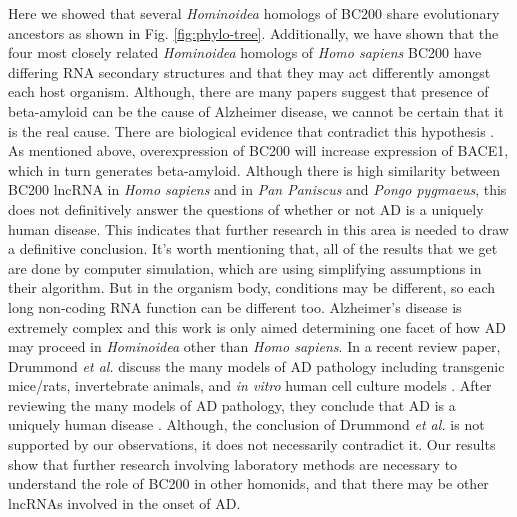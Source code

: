 \documentclass[conference, 11pt]{IEEEtran}
\begin{document}
Here we showed that several \emph{Hominoidea} homologs of BC200 share evolutionary ancestors as shown in Fig. \ref{fig:phylo-tree}. 
Additionally, we have shown that the four most closely related \emph{Hominoidea} homologs of \emph{Homo sapiens} BC200 have differing RNA secondary structures and that they may act differently amongst each host organism. 
Although, there are many papers suggest that presence of beta-amyloid can be the cause of Alzheimer disease, we cannot be certain that it is the real cause. 
There are biological evidence that contradict this hypothesis \cite{selkoe2016amyloid}. 
As mentioned above, overexpression of BC200 will increase expression of BACE1, which in turn generates beta-amyloid. 
Although there is high similarity between BC200 lncRNA in \emph{Homo sapiens} and in \emph{Pan Paniscus} and \emph{Pongo pygmaeus}, this does not definitively answer the questions of whether or not AD is a uniquely human disease.
This indicates that further research in this area is needed to draw a definitive conclusion. 
It's worth mentioning that, all of the results that we get are done by computer simulation, which are using simplifying assumptions in their algorithm. 
But in the organism body, conditions may be different, so each long non-coding RNA function can be different too. 
Alzheimer’s disease is extremely complex and this work is only aimed determining one facet of how AD may proceed in \emph{Hominoidea} other than \emph{Homo sapiens}. 
In a recent review paper, Drummond \emph{et al.} discuss the many models of AD pathology including transgenic mice/rats, invertebrate animals, and \emph{in vitro} human cell culture models \cite{drummond2017alzheimer}. 
After reviewing the many models of AD pathology, they conclude that AD is a uniquely human disease \cite{drummond2017alzheimer}. 
Although, the conclusion of Drummond \emph{et al.} is not supported by our observations, it does not necessarily contradict it. 
Our results show that further research involving laboratory methods are necessary to understand the role of BC200 in other homonids, and that there may be other lncRNAs involved in the onset of AD.
\end{document}
